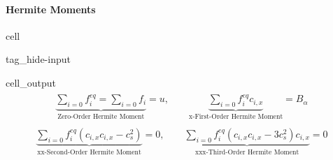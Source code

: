 \documentclass[letterpaper,10pt,english,openany,oneside]{jupyterBook}
\begin{document}
\paragraph{Hermite Moments}
\label{\detokenize{LBM-Study/Convective-Equation:hermite-moments}}
\begin{sphinxuseclass}{cell}
\begin{sphinxuseclass}{tag_hide-input}\begin{sphinxVerbatimOutput}

\begin{sphinxuseclass}{cell_output}\begin{equation*}
\begin{split}\displaystyle \begin{gathered}\underbrace{\sum_{i=0} f_{i}^{eq} =\sum_{i=0} f_{i} }_{\textrm{Zero-Order Hermite Moment}} =u,\quad \quad \underbrace{\sum_{i=0} f_{i}^{eq}c_{i,x} }_{\textrm{x-First-Order Hermite Moment}} =B_{\alpha}\end{gathered}\end{split}
\end{equation*}\begin{equation*}
\begin{split}\displaystyle \begin{gathered}\underbrace{\sum_{i=0} f_{i}^{eq} \left(c_{i,x}c_{i,x} - c_{s}^{2}\right) }_{\textrm{xx-Second-Order Hermite Moment}} =0,\quad \quad \underbrace{\sum_{i=0} f_{i}^{eq} \left(c_{i,x}c_{i,x} - 3c_{s}^{2} \right) c_{i,x} }_{\textrm{xxx-Third-Order Hermite Moment}} =0\end{gathered}\end{split}
\end{equation*}
\end{sphinxuseclass}\end{sphinxVerbatimOutput}

\end{sphinxuseclass}
\end{sphinxuseclass}
\end{document}
